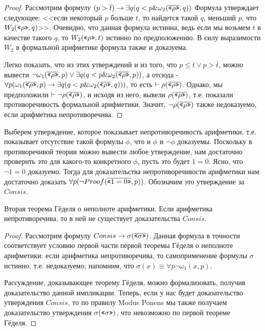 \begin{proof}
Рассмотрим формулу $(p > \overline{t}) \rightarrow \exists q (q < p \& \omega_2 (\overline{\texttt{<<}\rho\texttt{>>}},q))$
Формула утверждает следующее: <<если некоторый $p$ больше $t$, то найдется
такой $q$, меньший $p$, что $W_2 (\texttt{<<}\rho\texttt{>>},q)$>>. Очевидно, что данная формула истинна,
ведь если мы возьмем $t$ в качестве такого $q$, то $W_2 (\texttt{<<}\rho\texttt{>>},t)$ истинно 
по предположению. В силу выразимости $W_2$ в формальной арифметике формула также и доказуема.

Легко показать, что из этих утверждений и из того, что $p \le \overline{t} \vee p > \overline{t}$,
можно вывести $\neg \omega_1 (\overline{\texttt{<<}\rho\texttt{>>}},p) \vee \exists q (q < p \& \omega_2 (\overline{\texttt{<<}\rho\texttt{>>}},p))$,
а отсюда - $\forall p (\omega_1 (\overline{\texttt{<<}\rho\texttt{>>}},p) \rightarrow \exists q (q < p \& \omega_2 (\overline{\texttt{<<}\rho\texttt{>>}},q)))$,
то есть $\vdash\rho(\overline{\texttt{<<}\rho\texttt{>>}})$. Однако, мы предположили $\vdash\neg\rho(\overline{\texttt{<<}\rho\texttt{>>}})$, и исходя из него,
вывели $\rho(\overline{\texttt{<<}\rho\texttt{>>}})$, т.е. показали противоречивость формальной арифметики. Значит, 
$\neg \rho(\overline{\texttt{<<}\rho\texttt{>>}})$ также недоказуемо, если арифметика непротиворечива.
\end{proof}

Выберем утверждение, которое показывает непротиворечивость арифметики, т.е. 
показывает отсутствие такой формулы $\phi$, что и $\phi$ и $\neg \phi$ доказуемы.
Поскольку в противоречивой теории можно вывести любое утверждение, нам
достаточно проверить это для какого-то конкретного $\phi$, пусть это будет
$1=0$. Ясно, что $\neg 1=0$ доказуемо.
 Тогда для доказательства непротиворечивости арифметики нам достаточно
доказать $\forall p (\neg Proof (\overline{\texttt{<<}1=0\texttt{>>}}, p))$. Обозначим это утверждение
за $Consis$.

\begin{theorem}{Вторая теорема Гёделя о неполноте арифметики.}
Если арифметика непротиворечива, то в ней не существует доказательства $Consis$.
\end{theorem}

\begin{proof}
Рассмотрим формулу $Consis \rightarrow \sigma(\overline{\texttt{<<}\sigma\texttt{>>}})$.
Данная формула в точности соответствует условию первой части первой теоремы Гёделя 
о неполноте арифметики: 
если арифметика непротиворечива, то самоприменение формулы $\sigma$ истинно, т.е.
недоказуемо; напомним, что $\sigma(x) \equiv \forall p \neg \omega_1 (x,p)$.

Рассуждение, доказывающее теорему Гёделя, можно формализовать, получив доказательство
данной импликации. Теперь, если у нас будет доказательство утверждения $Consis$,
то по правилу Modus Ponens мы также получаем доказательство утверждения 
$\sigma (\texttt{<<}\sigma\texttt{>>})$, что невозможно по первой теореме Гёделя.
\end{proof}

